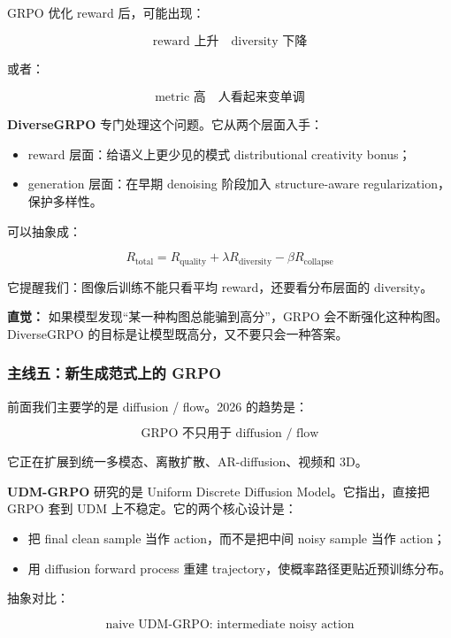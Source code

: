 GRPO 优化 reward 后，可能出现：

\[
\text{reward 上升}
\quad
\text{diversity 下降}
\]

或者：

\[
\text{metric 高}
\quad
\text{人看起来变单调}
\]

\textbf{DiverseGRPO} 专门处理这个问题。它从两个层面入手：

\begin{itemize}[leftmargin=1.5em]
  \item reward 层面：给语义上更少见的模式 distributional creativity bonus；
  \item generation 层面：在早期 denoising 阶段加入 structure-aware regularization，保护多样性。
\end{itemize}

可以抽象成：

\[
R_\text{total}
=
R_\text{quality}
+
\lambda R_\text{diversity}
-
\beta R_\text{collapse}
\]

它提醒我们：图像后训练不能只看平均 reward，还要看分布层面的 diversity。

\begin{intubox}
\textbf{直觉：} 如果模型发现“某一种构图总能骗到高分”，GRPO 会不断强化这种构图。DiverseGRPO 的目标是让模型既高分，又不要只会一种答案。
\end{intubox}

\subsubsection{主线五：新生成范式上的 GRPO}

前面我们主要学的是 diffusion / flow。2026 的趋势是：

\[
\text{GRPO 不只用于 diffusion / flow}
\]

它正在扩展到统一多模态、离散扩散、AR-diffusion、视频和 3D。

\textbf{UDM-GRPO} 研究的是 Uniform Discrete Diffusion Model。它指出，直接把 GRPO 套到 UDM 上不稳定。它的两个核心设计是：

\begin{itemize}[leftmargin=1.5em]
  \item 把 final clean sample 当作 action，而不是把中间 noisy sample 当作 action；
  \item 用 diffusion forward process 重建 trajectory，使概率路径更贴近预训练分布。
\end{itemize}

抽象对比：

\[
\text{naive UDM-GRPO: intermediate noisy action}
\]

